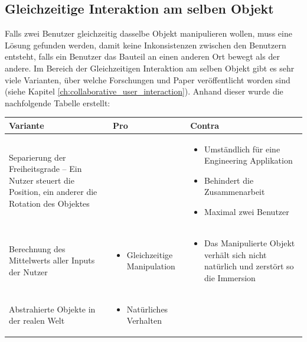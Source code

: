 \subsection{Gleichzeitige Interaktion am selben Objekt}
Falls zwei Benutzer gleichzeitig dasselbe Objekt manipulieren wollen, muss eine Lösung gefunden werden, damit keine Inkonsistenzen zwischen den Benutzern entsteht, falls ein Benutzer das Bauteil an einen anderen Ort bewegt als der andere. Im Bereich der Gleichzeitigen Interaktion am selben Objekt gibt es sehr viele Varianten, über welche Forschungen und Paper veröffentlicht worden sind (siehe Kapitel \ref{ch:collaborative_user_interaction}). Anhand dieser wurde die nachfolgende Tabelle erstellt:

\begin{center}
	\begin{tabularx} {\textwidth} { | B | B | B | }
		\hline
		\color{white} \textbf{Variante} & \color{white} \textbf{Pro} & 
		\color{white} \textbf{Contra} \\
		\hline
		\vspace{1pt}
		Separierung der Freiheitsgrade – Ein Nutzer steuert die Position, ein anderer die Rotation des Objektes &  &
		\begin{itemize} [leftmargin=*,noitemsep,topsep=0pt]
			\item Umständlich für eine Engineering Applikation
			\item Behindert die Zusammenarbeit
			\item Maximal zwei Benutzer
		\end{itemize} \\
		\hline
		\vspace{1pt}
		Berechnung des Mittelwerts aller Inputs der Nutzer & 
		\begin{itemize} [leftmargin=*,noitemsep,topsep=0pt]
			\item Gleichzeitige Manipulation
		\end{itemize} & 
		\begin{itemize} [leftmargin=*,noitemsep,topsep=0pt]
			\item Das Manipulierte Objekt verhält sich nicht natürlich und zerstört so die Immersion
		\end{itemize} \\
		\hline
		\vspace{1pt}
		Abstrahierte Objekte in der realen Welt & 
		\begin{itemize} [leftmargin=*,noitemsep,topsep=0pt]
			\item Natürliches Verhalten

\end{itemize}
\end{tabularx}
\end{center}
